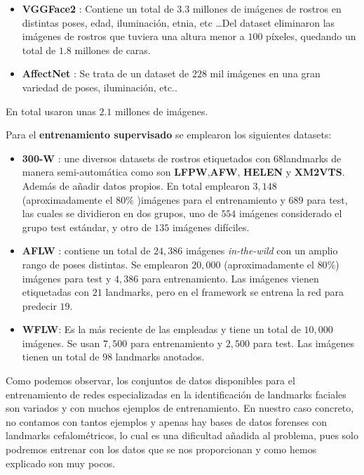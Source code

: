             \begin{itemize}
                \item \textbf{VGGFace2} : Contiene un total de $3.3$ millones de imágenes de rostros en distintas poses, edad, iluminación, etnia, etc \ldots  Del dataset eliminaron las imágenes de rostros que tuviera una altura menor a $100$ píxeles, quedando un total de $1.8$ millones de caras.
                \item \textbf{AffectNet} : Se trata de un dataset de $228$ mil imágenes en una gran variedad de poses, iluminación, etc..
            \end{itemize}

            \noindent En total usaron unas $2.1$ millones de imágenes.

            \noindent Para el \textbf{entrenamiento supervisado} se emplearon los siguientes datasets: 

            \begin{itemize}
                \item \textbf{300-W} : une diversos datasets de rostros etiquetados con \textbf{$68$}landmarks de manera semi-automática como son \textbf{LFPW},\textbf{AFW}, \textbf{HELEN} y \textbf{XM2VTS}. Además de añadir datos propios. En total emplearon $3,148$ (aproximadamente el $80 \%$ )imágenes para el entrenamiento y $689$ para test, las cuales se dividieron en dos grupos, uno de $554$ imágenes considerado el grupo test estándar, y otro de $135$ imágenes difíciles.
                \item \textbf{AFLW} : contiene un total de $24,386$ imágenes \textit{in-the-wild} con un amplio rango de poses distintas. Se emplearon $20,000$ (aproximadamente el $80 \%$) imágenes para test y $4,386$ para entrenamiento. Las imágenes vienen etiquetadas con $21$ landmarks, pero en el framework se entrena la red para predecir \textbf{$19$}.
                \item \textbf{WFLW}: Es la más reciente de las empleadas y tiene un total de $10,000$ imágenes. Se usan $7,500$ para entrenamiento y $2,500$ para test. Las imágenes tienen un total de \textbf{$98$} landmarks anotados.
            \end{itemize}

            \medskip

            \noindent Como podemos observar, los conjuntos de datos disponibles para el entrenamiento de redes especializadas en la identificación de landmarks faciales son variados y con muchos ejemplos de entrenamiento. En nuestro caso concreto, no contamos con tantos ejemplos y apenas hay bases de datos forenses con landmarks cefalométricos, lo cual es una dificultad añadida al problema, pues solo podremos entrenar con los datos que se nos proporcionan y como hemos explicado son muy pocos.

